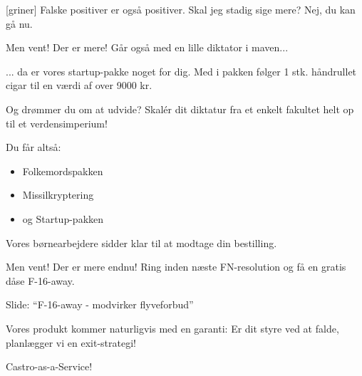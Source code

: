 \documentclass[a4paper,11pt]{article}
\begin{document}
\begin{sketch}
  [griner] Falske positiver er også positiver.
   Skal jeg stadig sige mere?
   Nej, du kan gå nu.

   Men vent!  Der er mere!  Går også med en
  lille diktator i maven...


   ... da er vores startup-pakke noget for dig.  Med i pakken
  følger 1 stk. håndrullet cigar til en værdi af over 9000 kr.


   Og drømmer du om at udvide?  Skalér dit diktatur fra et
  enkelt fakultet helt op til et verdensimperium!

   Du får altså:

  \begin{itemize}
    \item{Folkemordspakken}
    \item{Missilkryptering}
    \item{og Startup-pakken}
  \end{itemize}

   Vores børnearbejdere sidder klar til at modtage din bestilling.

   Men vent! Der er mere endnu! Ring inden næste FN-resolution og få en gratis dåse F-16-away.

  \scene Slide: ``F-16-away - modvirker flyveforbud''

   Vores produkt kommer naturligvis med en garanti: Er dit styre ved at falde, planlægger vi en exit-strategi!


   Castro-as-a-Service!

\end{sketch}
\end{document}
